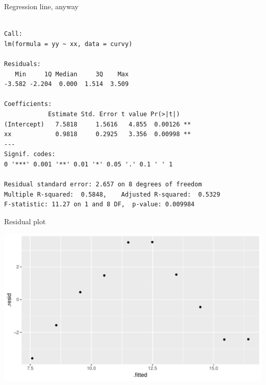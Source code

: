 \begin{frame}[fragile]{Regression line, anyway}

{\footnotesize
 
\begin{knitrout}
\color{fgcolor}\begin{kframe}
\begin{alltt}
\hlkwb{=}\hlopt{~} 
\end{alltt}
\begin{verbatim}

Call:
lm(formula = yy ~ xx, data = curvy)

Residuals:
   Min     1Q Median     3Q    Max 
-3.582 -2.204  0.000  1.514  3.509 

Coefficients:
            Estimate Std. Error t value Pr(>|t|)   
(Intercept)   7.5818     1.5616   4.855  0.00126 **
xx            0.9818     0.2925   3.356  0.00998 **
---
Signif. codes:  
0 '***' 0.001 '**' 0.01 '*' 0.05 '.' 0.1 ' ' 1

Residual standard error: 2.657 on 8 degrees of freedom
Multiple R-squared:  0.5848,	Adjusted R-squared:  0.5329 
F-statistic: 11.27 on 1 and 8 DF,  p-value: 0.009984
\end{verbatim}
\end{kframe}
\end{knitrout}
}
  
\end{frame}



\begin{frame}[fragile]{Residual plot}

 
\begin{knitrout}
\color{fgcolor}\begin{kframe}
\begin{alltt}
\hlstd{(}\hlopt{+}\hlstd{()}
\end{alltt}
\end{kframe}
\includegraphics[width=\maxwidth]{figure/altoadige-1} 

\end{knitrout}
  
  

  
\end{frame}

